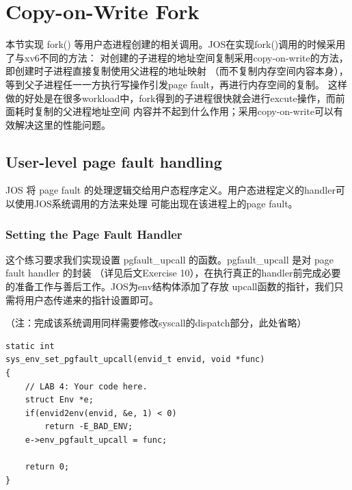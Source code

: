 \documentclass[12pt, letterpaper]{report}
\begin{document}
\chapter[\Large Copy-on-Write Fork]{Copy-on-Write Fork}
本节实现 fork() 等用户态进程创建的相关调用。JOS在实现fork()调用的时候采用了与xv6不同的方法：
对创建的子进程的地址空间复制采用copy-on-write的方法，即创建时子进程直接复制使用父进程的地址映射
（而不复制内存空间内容本身），等到父子进程任一一方执行写操作引发page fault，再进行内存空间的复制。
这样做的好处是在很多workload中，fork得到的子进程很快就会进行excute操作，而前面耗时复制的父进程地址空间
内容并不起到什么作用；采用copy-on-write可以有效解决这里的性能问题。\par

\section[\large User-level page fault handling]{User-level page fault handling}

JOS 将 page fault 的处理逻辑交给用户态程序定义。用户态进程定义的handler可以使用JOS系统调用的方法来处理
可能出现在该进程上的page fault。

\subsection{Setting the Page Fault Handler}
这个练习要求我们实现设置 pgfault\_upcall 的函数。pgfault\_upcall 是对 page fault handler 的封装
（详见后文Exercise 10），在执行真正的handler前完成必要的准备工作与善后工作。JOS为env结构体添加了存放
upcall函数的指针，我们只需将用户态传递来的指针设置即可。\par
（注：完成该系统调用同样需要修改syscall的dispatch部分，此处省略）
\newpage
\lstset{style=CStyle}
\setmainfont{Consolas}
\begin{lstlisting}
static int
sys_env_set_pgfault_upcall(envid_t envid, void *func)
{
    // LAB 4: Your code here.
    struct Env *e;
    if(envid2env(envid, &e, 1) < 0)
        return -E_BAD_ENV;
    e->env_pgfault_upcall = func;

    return 0;
}
\end{lstlisting}
\setmainfont{Times New Roman}
\end{document}
